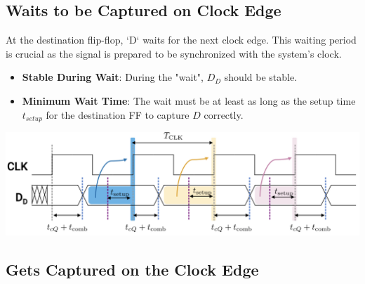 \documentclass[12pt,openany]{book}
\begin{document}
\subsection{Waits to be Captured on Clock Edge}

\begin{minipage}{0.55\textwidth}
    At the destination flip-flop, `D` waits for the next clock edge. This waiting period is crucial as the signal is prepared to be synchronized with the system's clock.

    \begin{itemize}
        \item[] \textbf{Stable During Wait}: During the "wait", $D_D$ should be stable.
        \item[] \textbf{Minimum Wait Time}: The wait must be at least as long as the setup time $t_{setup}$ for the destination FF to capture $D$ correctly.
    \end{itemize}
\end{minipage}
\hfill
\vline
\hfill
\begin{minipage}{0.4\textwidth}
    \centering
    \includegraphics[width=1.3\textwidth]{circuits/15.4.4.png}
\end{minipage}
\vspace*{20px}
\subsection{Gets Captured on the Clock Edge}
\end{document}
